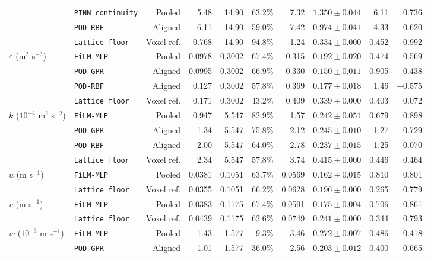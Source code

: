 \documentclass[11pt]{article}
\begin{document}
\begin{table}[!htbp]
{\begin{tabular}{llrrrrrrrr}
 & \texttt{PINN continuity} & Pooled & 5.48 & 14.90 & 63.2\% & 7.32 & $1.350 \pm 0.044$ & 6.11 & 0.736 \\
 & \texttt{POD-RBF} & Aligned & 6.11 & 14.90 & 59.0\% & 7.42 & $0.974 \pm 0.041$ & 4.33 & 0.620 \\
 & \texttt{Lattice floor} & Voxel ref. & 0.768 & 14.90 & 94.8\% & 1.24 & $0.334 \pm 0.000$ & 0.452 & 0.992 \\
\midrule
$\varepsilon$ (m$^2$ s$^{-3}$) & \texttt{FiLM-MLP} & Pooled & 0.0978 & 0.3002 & 67.4\% & 0.315 & $0.192 \pm 0.020$ & 0.474 & 0.569 \\
 & \texttt{POD-GPR} & Aligned & 0.0995 & 0.3002 & 66.9\% & 0.330 & $0.150 \pm 0.011$ & 0.905 & 0.438 \\
 & \texttt{POD-RBF} & Aligned & 0.127 & 0.3002 & 57.8\% & 0.369 & $0.177 \pm 0.018$ & 1.46 & $-0.575$ \\
 & \texttt{Lattice floor} & Voxel ref. & 0.171 & 0.3002 & 43.2\% & 0.409 & $0.339 \pm 0.000$ & 0.403 & 0.072 \\
\midrule
$k$ ($10^{-4}$ m$^2$ s$^{-2}$) & \texttt{FiLM-MLP} & Pooled & 0.947 & 5.547 & 82.9\% & 1.57 & $0.242 \pm 0.051$ & 0.679 & 0.898 \\
 & \texttt{POD-GPR} & Aligned & 1.34 & 5.547 & 75.8\% & 2.12 & $0.245 \pm 0.010$ & 1.27 & 0.729 \\
 & \texttt{POD-RBF} & Aligned & 2.00 & 5.547 & 64.0\% & 2.78 & $0.237 \pm 0.015$ & 1.25 & $-0.070$ \\
 & \texttt{Lattice floor} & Voxel ref. & 2.34 & 5.547 & 57.8\% & 3.74 & $0.415 \pm 0.000$ & 0.446 & 0.464 \\
\midrule
$u$ (m s$^{-1}$) & \texttt{FiLM-MLP} & Pooled & 0.0381 & 0.1051 & 63.7\% & 0.0569 & $0.162 \pm 0.015$ & 0.810 & 0.801 \\
 & \texttt{Lattice floor} & Voxel ref. & 0.0355 & 0.1051 & 66.2\% & 0.0628 & $0.196 \pm 0.000$ & 0.265 & 0.779 \\
\midrule
$v$ (m s$^{-1}$) & \texttt{FiLM-MLP} & Pooled & 0.0383 & 0.1175 & 67.4\% & 0.0591 & $0.175 \pm 0.004$ & 0.706 & 0.861 \\
 & \texttt{Lattice floor} & Voxel ref. & 0.0439 & 0.1175 & 62.6\% & 0.0749 & $0.241 \pm 0.000$ & 0.344 & 0.793 \\
\midrule
$w$ ($10^{-3}$ m s$^{-1}$) & \texttt{FiLM-MLP} & Pooled & 1.43 & 1.577 & 9.3\% & 3.46 & $0.272 \pm 0.007$ & 0.486 & 0.418 \\
 & \texttt{POD-GPR} & Aligned & 1.01 & 1.577 & 36.0\% & 2.56 & $0.203 \pm 0.012$ & 0.400 & 0.665 \\

\end{tabular}}
\end{table}
\end{document}
